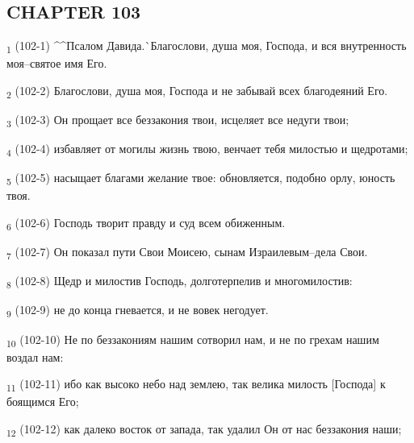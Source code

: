 \subsection{CHAPTER 103}
\begin{tcolorbox}
\textsubscript{1} (102-1) ^^Псалом Давида.^^ Благослови, душа моя, Господа, и вся внутренность моя--святое имя Его.
\end{tcolorbox}
\begin{tcolorbox}
\textsubscript{2} (102-2) Благослови, душа моя, Господа и не забывай всех благодеяний Его.
\end{tcolorbox}
\begin{tcolorbox}
\textsubscript{3} (102-3) Он прощает все беззакония твои, исцеляет все недуги твои;
\end{tcolorbox}
\begin{tcolorbox}
\textsubscript{4} (102-4) избавляет от могилы жизнь твою, венчает тебя милостью и щедротами;
\end{tcolorbox}
\begin{tcolorbox}
\textsubscript{5} (102-5) насыщает благами желание твое: обновляется, подобно орлу, юность твоя.
\end{tcolorbox}
\begin{tcolorbox}
\textsubscript{6} (102-6) Господь творит правду и суд всем обиженным.
\end{tcolorbox}
\begin{tcolorbox}
\textsubscript{7} (102-7) Он показал пути Свои Моисею, сынам Израилевым--дела Свои.
\end{tcolorbox}
\begin{tcolorbox}
\textsubscript{8} (102-8) Щедр и милостив Господь, долготерпелив и многомилостив:
\end{tcolorbox}
\begin{tcolorbox}
\textsubscript{9} (102-9) не до конца гневается, и не вовек негодует.
\end{tcolorbox}
\begin{tcolorbox}
\textsubscript{10} (102-10) Не по беззакониям нашим сотворил нам, и не по грехам нашим воздал нам:
\end{tcolorbox}
\begin{tcolorbox}
\textsubscript{11} (102-11) ибо как высоко небо над землею, так велика милость [Господа] к боящимся Его;
\end{tcolorbox}
\begin{tcolorbox}
\textsubscript{12} (102-12) как далеко восток от запада, так удалил Он от нас беззакония наши;
\end{tcolorbox}
